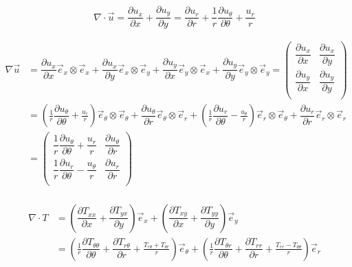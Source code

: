 \documentclass{article}
\numberwithin{equation}{section}
\newcommand{\pd}[2]{\dfrac{\partial #1}{\partial #2}}
\newcommand{\unitvec}[1]{\vec{e}_{#1}}
\renewcommand{\div}{\nabla \cdot}
\begin{document}
\begin{equation}
    \div \vec{u}
    = \pd{u_x}{x} + \pd{u_y}{y}
    = \pd{u_r}{r} + \frac1r \pd{u_\theta}{\theta} + \frac{u_r}{r}
\end{equation}

\begin{equation}
    \begin{aligned}
        \nabla \vec{u}
        &= \pd{u_x}{x} \unitvec{x} \otimes \unitvec{x} +
          \pd{u_x}{y} \unitvec{x} \otimes \unitvec{y} +
          \pd{u_y}{x} \unitvec{y} \otimes \unitvec{x} +
          \pd{u_y}{y} \unitvec{y} \otimes \unitvec{y}
        = \left(\begin{matrix}
            \pd{u_x}{x} & \pd{u_x}{y} \\
            \pd{u_y}{x} & \pd{u_y}{y} \\
        \end{matrix}\right) \\
        &=
            \left(\frac1r \pd{u_\theta}{\theta} + \frac{u_r}{r}\right) \vec{e}_\theta \otimes \vec{e}_\theta +
            \pd{u_\theta}{r} \vec{e}_\theta \otimes \unitvec{r} +
            \left(\frac1r \pd{u_r}{\theta} - \frac{u_\theta}{r}\right) \unitvec{r} \otimes \vec{e}_\theta +
            \pd{u_r}{r} \unitvec{r} \otimes \unitvec{r} \\
        &= \left(\begin{matrix}
            \dfrac1r \pd{u_\theta}{\theta} + \dfrac{u_r}{r} & \pd{u_\theta}{r} \\
            \dfrac1r \pd{u_r}{\theta} - \dfrac{u_\theta}{r} & \pd{u_r}{r} \\
        \end{matrix}\right) \\
    \end{aligned}
\end{equation}

\begin{equation}
    \begin{aligned}
        \div T &=
            \left(\pd{T_{xx}}{x} + \pd{T_{yx}}{y}\right) \unitvec{x} +
            \left(\pd{T_{xy}}{x} + \pd{T_{yy}}{y}\right) \unitvec{y} \\
        &=
            \left(\frac1r \pd{T_{\theta \theta}}{\theta} + \pd{T_{r\theta}}{r} + \frac{T_{r\theta} + T_{\theta r}}{r}\right) \vec{e}_\theta +
            \left(\frac1r \pd{T_{\theta r}}{\theta} + \pd{T_{rr}}{r} + \frac{T_{rr} - T_{\theta \theta}}{r}\right) \unitvec{r}
    \end{aligned}
\end{equation}
\end{document}
